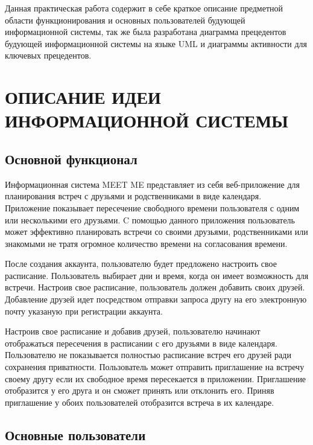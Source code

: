 \documentclass[14pt]{extreport}
\begin{document}
\pagestyle{empty} %



\pagestyle{plain} %
\tableofcontents
\intro\label{intro} 

Данная практическая работа содержит в себе краткое описание предметной области функционирования и основных пользователей будующей информационной системы, так же была разработана диаграмма прецедентов будующей информационной системы на языке UML и диаграммы активности для ключевых прецедентов.


\chapter{ОПИСАНИЕ ИДЕИ ИНФОРМАЦИОННОЙ СИСТЕМЫ \label{chapter1}}

\section{Основной функционал}

Информационная система MEET ME представляет из себя веб-приложение для планирования встреч с друзьями и родственниками в виде календаря. 
Приложение показывает пересечение свободного времени пользователя с одним или несколькими его друзьями.
C помощью данного приложения пользователь может эффективно планировать встречи со своими друзьями, родственниками или знакомыми не тратя огромное количество времени на согласования времени. 

После создания аккаунта, пользователю будет предложено настроить свое расписание. Пользователь выбирает дни и время, когда он имеет возможность для встречи. 
Настроив свое расписание, пользователь должен добавить своих друзей.  Добавление друзей идет посредством отправки запроса другу на его электронную почту указаную при регистрации аккаунта.

Настроив свое расписание и добавив друзей, пользователю начинают отображаться пересечения в расписании с его друзьями в виде календаря. Пользователю не показывается полностью расписание встреч его друзей ради сохранения приватности. Пользователь может отправить приглашение на встречу своему другу если их свободное время пересекается в приложении. Приглашение отобразится у его друга и он сможет принять или отклонить его. Приняв приглашение у обоих пользователей отобразится встреча в их календаре. 

\section{Основные пользователи}
\end{document}
